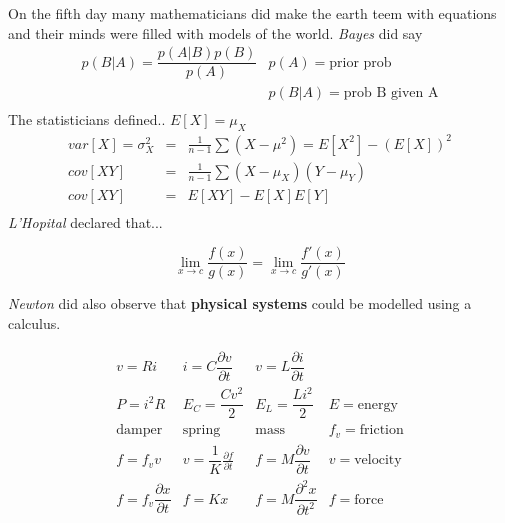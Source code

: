 
On the fifth day many mathematicians did make the earth teem with equations and
their minds were filled with models of the world.
\vfill
\emph{Bayes} did say \ \ 
\[
\begin{array}{ll}
p(B|A) = \dfrac{p(A|B)p(B)}{p(A)}&p(A)=\mbox{prior prob}\\
&p(B|A)=\mbox{prob B given A}\\
\end{array}
\]
\vfill
The statisticians defined.. $E[X]=\mu_X$
\[
\begin{array}{rcl}
var[X]=\sigma_X^2&=&\frac{1}{n-1}\sum (X-\mu^2)=E[X^2]-(E[X])^2\\
cov[XY]&=&\frac{1}{n-1}\sum(X-\mu_X)(Y-\mu_Y)\\
cov[XY]&=&E[XY]-E[X]E[Y]\\
\end{array}
\]
\vfill
\emph{L'Hopital} declared that...

\[\mathop {\lim }\limits_{x \to c} \frac{{f\left( x \right)}}{{g\left( x
\right)}} = \mathop {\lim }\limits_{x \to c} \frac{{f'\left( x
\right)}}{{g'\left( x \right)}}\]


\vfill
\emph{Newton} did  also observe that \textbf{physical systems} could be
modelled using a calculus.

\[
\begin{array}{cccl}
v = Ri&i = C\dfrac{\partial v}{\partial t}&v = L\dfrac{\partial i}{\partial
t}\\

P = i^2R & E_C = \dfrac{Cv^2}{2} & E_L = \dfrac{Li^2}{2}& E = \mbox{energy}\\

\mbox{damper}&\mbox{spring}&\mbox{mass}&f_v = \mbox{friction}\\
f = f_v v   & v = \dfrac{1}{K}\frac{\partial f}{\partial t}&f =
M\dfrac{\partial v}{\partial t}&v = \mbox{velocity}\\ f = f_v\dfrac{\partial
x}{\partial t}    &   f=Kx    & f = M \dfrac{\partial^2 x}{\partial t^2}&f =
\mbox{force}
\end{array}
\]

\columnbreak

